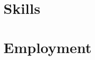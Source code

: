 \documentclass[11pt]{moderncv}
\begin{document}
\maketitle

\section{Skills}


\section{Employment}





% 
\end{document}

